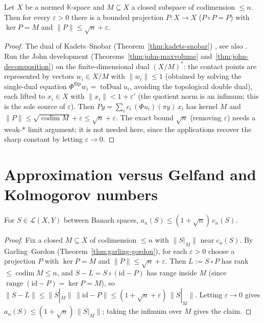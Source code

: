 \begin{theorem}
\label{thm:garling-gordon}
\leanok
Let $X$ be a normed $\mathbb{K}$-space and $M \subseteq X$ a closed subspace of
codimension $\le n$. Then for every $\varepsilon > 0$ there is a bounded
projection $P : X \to X$ ($P \circ P = P$) with $\ker P = M$ and
$\|P\| \le \sqrt{n} + \varepsilon$.
\end{theorem}
\begin{proof}
\leanok
{}
The dual of Kadets--Snobar (Theorem~\ref{thm:kadets-snobar}) \cite{GG71}, see
also \cite[1.7.17]{Pietsch87}. Run the John development
(Theorems~\ref{thm:john-maxvolume} and~\ref{thm:john-decomposition})
on the finite-dimensional dual $(X/M)^*$: the contact points are
represented by vectors $w_i \in X/M$ with $\|w_i\| \le 1$ (obtained by solving
the single-dual equation $\Phi^{\mathrm{flip}} w_i = \operatorname{toDual} u_i$,
avoiding the topological double dual), each lifted to $x_i \in X$ with
$\|x_i\| < 1 + \varepsilon'$ (the quotient norm is an infimum; this is the sole
source of $\varepsilon$). Then $P y = \sum_i c_i\,(\Phi u_i)(\pi y)\, x_i$ has kernel $M$
and $\|P\| \le \sqrt{\operatorname{codim} M} + \varepsilon \le \sqrt{n} +
\varepsilon$. The exact bound
$\sqrt{n}$ (removing $\varepsilon$) needs a weak-$*$ limit argument; it is not
needed here, since the applications recover the sharp constant by letting
$\varepsilon \to 0$.
\end{proof}

\section{Approximation versus Gelfand and Kolmogorov numbers}
\label{sec:ineq-forward}

\begin{theorem}
\label{thm:approx-le-gelfand}
\leanok
{}
For $S \in \mathcal{L}(X, Y)$ between Banach spaces,
$a_n(S) \le (1 + \sqrt{n})\,c_n(S)$.
\end{theorem}
\begin{proof}
\leanok
{}
Fix a closed $M \subseteq X$ of codimension $\le n$ with $\|S|_M\|$ near
$c_n(S)$. By Garling--Gordon (Theorem~\ref{thm:garling-gordon}), for each
$\varepsilon>0$ choose a projection $P$ with $\ker P = M$ and
$\|P\| \le \sqrt n + \varepsilon$. Then $L := S \circ P$ has rank
$\le \operatorname{codim} M \le n$, and $S - L = S \circ (\mathrm{id} - P)$ has
range inside $M$ (since $\operatorname{range}(\mathrm{id}-P) = \ker P = M$), so
$\|S - L\| \le \|S|_M\|\,\|\mathrm{id} - P\| \le (1+\sqrt n+\varepsilon)\,\|S|_M\|$.
Letting $\varepsilon \to 0$ gives $a_n(S) \le (1+\sqrt n)\,\|S|_M\|$; taking the
infimum over $M$ gives the claim.
\end{proof}

